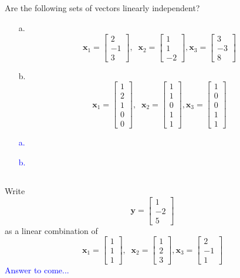 \documentclass[a4paper,12pt]{article}
\newcommand{\M}[1]{ \begin{bmatrix} #1 \end{bmatrix} }
\newcommand{\vecx}{\textbf{x}}
\newcommand{\vecy}{\textbf{y}}
\begin{document}
\subsection{}
Are the following sets of vectors linearly independent?
\begin{itemize}
 \item [a.] $$\vecx_1 = \M{2\\-1\\3}, \;\; \vecx_2 = \M{1\\1\\-2}, \vecx_3 = \M{3\\-3\\8}$$
 \item [b.] $$\vecx_1 = \M{1\\2\\1\\0\\0}, \;\; \vecx_2 = \M{1\\1\\0\\1\\1}, \vecx_3 = \M{1\\0\\0\\1\\1}$$
\end{itemize}
\textcolor{blue}{
\begin{itemize}
 \item [a.]
 \item [b.]
\end{itemize}
}
\subsection{}
Write $$\vecy=\M{1\\-2\\5}$$ as a linear combination of $$\vecx_1 = \M{1\\1\\1}, \;\; \vecx_2 = \M{1\\2\\3}, \vecx_3 = \M{2\\-1\\1}$$
\textcolor{blue}{
Answer to come...
}
\end{document}
